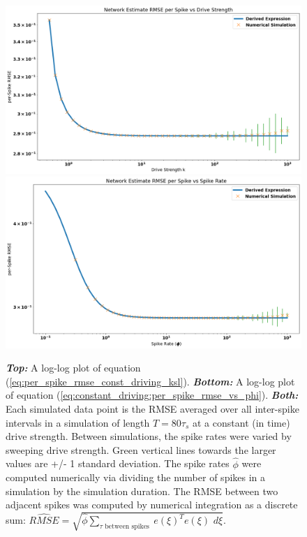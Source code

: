 \begin{enumerate}
\begin{figure}[h]
\includegraphics[width=\linewidth]{figures/rmse_sp_vs_k_const_driving.png}
\centering
\includegraphics[width=\linewidth]{figures/rmse_sp_vs_phi_const_driving.png}
\caption{\textbf{\textit{Top:}} A log-log plot of equation (\ref{eq:per_spike_rmse_const_driving_ksl}). \textbf{\textit{Bottom:}} A log-log plot of equation (\ref{eq:constant_driving:per_spike_rmse_vs_phi}). \textbf{\textit{Both:}} Each simulated data point is the RMSE averaged over all inter-spike intervals in a simulation of length $T = 80 \tau_s$ at a constant (in time) drive strength. Between simulations, the spike rates were varied by sweeping drive strength. Green vertical lines towards the larger values are +/- 1 standard deviation. The spike rates $\hat{\phi}$ were computed numerically via dividing the number of spikes in a simulation by the simulation duration. The RMSE between two adjacent spikes was computed by numerical integration as a discrete sum: $\hat{RMSE} = \sqrt{\hat{\phi} \sum_{\tau \text{ between spikes }} e(\xi)^T e(\xi) \, \, d\xi }$.}
\label{fig:const_driving_per_spike_rmse_vs_phi}
\end{figure}
\end{enumerate}
